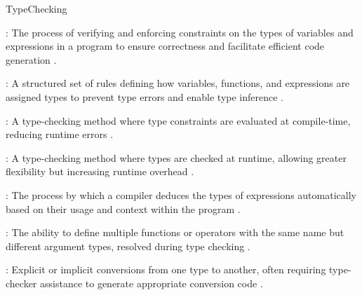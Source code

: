 \documentclass[hidelinks]{article}
\begin{document}
\begin{smodule}[title={Type Checking}]{TypeChecking}

    \begin{sdefinition}[for=TypeChecking]
        : The process of verifying and enforcing constraints on the types of variables and expressions in a program to ensure correctness and facilitate efficient code generation .
    \end{sdefinition}

    \begin{sdefinition}[for=TypeSystem]
        : A structured set of rules defining how variables, functions, and expressions are assigned types to prevent type errors and enable type inference .
    \end{sdefinition}

    \begin{sdefinition}[for=StaticTyping]
        : A type-checking method where type constraints are evaluated at compile-time, reducing runtime errors .
    \end{sdefinition}

    \begin{sdefinition}[for=DynamicTyping]
        : A type-checking method where types are checked at runtime, allowing greater flexibility but increasing runtime overhead .
    \end{sdefinition}

    \begin{sdefinition}[for=TypeInference]
        : The process by which a compiler deduces the types of expressions automatically based on their usage and context within the program .
    \end{sdefinition}

    \begin{sdefinition}[for=Overloading]
        : The ability to define multiple functions or operators with the same name but different argument types, resolved during type checking .
    \end{sdefinition}

    \begin{sdefinition}[for=TypeCasts]
        : Explicit or implicit conversions from one type to another, often requiring type-checker assistance to generate appropriate conversion code .
    \end{sdefinition}


\end{smodule}
\end{document}
